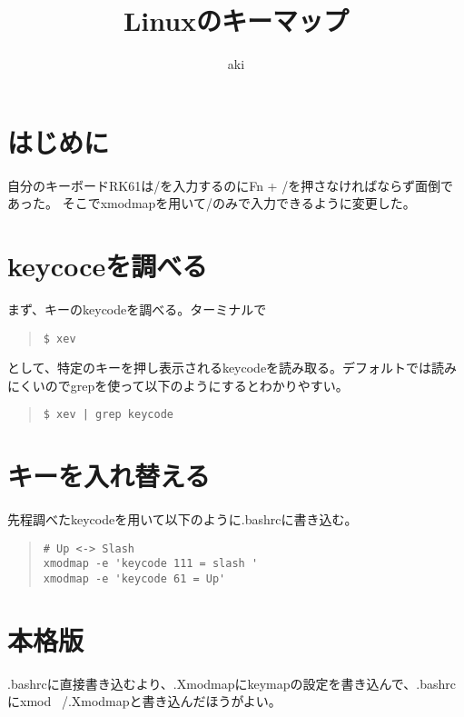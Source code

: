 \documentclass[dvipdfmx]{jsarticle}
\begin{document}
\title{Linuxのキーマップ}
\author{aki}
\thispagestyle{empty}
\maketitle

\section{はじめに}
自分のキーボードRK61は/を入力するのにFn + /を押さなければならず面倒であった。
そこでxmodmapを用いて/のみで入力できるように変更した。

\section{keycoceを調べる}

まず、キーのkeycodeを調べる。ターミナルで

\begin{quote}
    \begin{verbatim}
$ xev
    \end{verbatim}
\end{quote}

として、特定のキーを押し表示されるkeycodeを読み取る。デフォルトでは読みにくいのでgrepを使って以下のようにするとわかりやすい。

\begin{quote}
    \begin{verbatim}
$ xev | grep keycode
    \end{verbatim}
\end{quote}

\section{キーを入れ替える}

先程調べたkeycodeを用いて以下のように.bashrcに書き込む。

\begin{quote}
    \begin{verbatim}
# Up <-> Slash
xmodmap -e 'keycode 111 = slash '
xmodmap -e 'keycode 61 = Up'
    \end{verbatim}
\end{quote}

\section{本格版}

.bashrcに直接書き込むより、.Xmodmapにkeymapの設定を書き込んで、.bashrcにxmod ~/.Xmodmapと書き込んだほうがよい。
\end{document}
